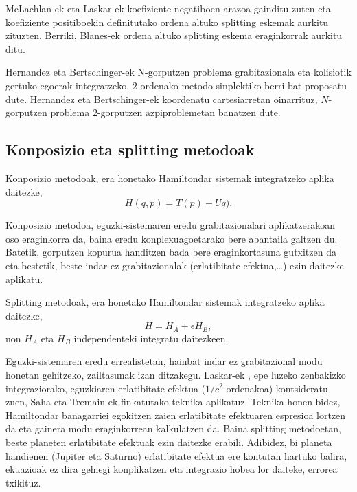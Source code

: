 McLachlan-ek \cite[1995]{McLachlan1995} eta Laskar-ek  \cite[2001]{Laskar2001} koefiziente negatiboen arazoa gainditu zuten eta koefiziente positiboekin definitutako ordena altuko splitting eskemak aurkitu zituzten. Berriki, Blanes-ek \cite[2012]{Blanes2013} ordena altuko splitting eskema  eraginkorrak aurkitu ditu. 

Hernandez eta Bertschinger-ek \cite[2015]{Hernandez2015} N-gorputzen problema grabitazionala eta kolisiotik gertuko egoerak integratzeko, $2$ ordenako metodo sinplektiko berri bat proposatu dute. Hernandez eta Bertschinger-ek \cite{Hernandez2015} koordenatu cartesiarretan oinarrituz, $N$-gorputzen problema $2$-gorputzen azpiproblemetan banatzen dute.


\subsection*{Konposizio eta splitting metodoak}


Konposizio metodoak, era honetako Hamiltondar sistemak integratzeko aplika daitezke,
\begin{equation*}
H(q,p)=T(p)+Uq).
\end{equation*}

Konposizio metodoa, eguzki-sistemaren eredu grabitazionalari aplikatzerakoan oso eraginkorra da, baina eredu konplexuagoetarako bere abantaila galtzen du. Batetik, gorputzen kopurua handitzen bada bere eraginkortasuna gutxitzen da eta bestetik, beste indar ez grabitazionalak (erlatibitate efektua,\dots) ezin daitezke aplikatu.

Splitting metodoak, era honetako Hamiltondar sistemak integratzeko aplika daitezke, 
\begin{equation}
\label{eq:Hban}
H=H_A+\epsilon H_B,
\end{equation}
non $H_A$ eta $H_B$ independenteki integratu daitezkeen. 

Eguzki-sistemaren eredu errealistetan, hainbat indar ez grabitazional modu honetan gehitzeko, zailtasunak izan ditzakegu.
Laskar-ek \cite[2011]{Laskar2011}, epe luzeko zenbakizko integraziorako,  eguzkiaren erlatibitate efektua ($1/c^2$ ordenakoa)  kontsideratu zuen, Saha eta Tremain-ek \cite{Saha1994} finkatutako teknika aplikatuz. Teknika honen bidez, Hamiltondar banagarriei egokitzen zaien erlatibitate efektuaren espresioa lortzen da eta gainera modu eraginkorrean kalkulatzen da. Baina splitting metodoetan, beste planeten erlatibitate efektuak ezin daitezke erabili. Adibidez, bi planeta handienen (Jupiter eta Saturno) erlatibitate efektua ere kontutan hartuko balira, ekuazioak ez dira gehiegi konplikatzen eta integrazio hobea lor daiteke, errorea txikituz. 
 
